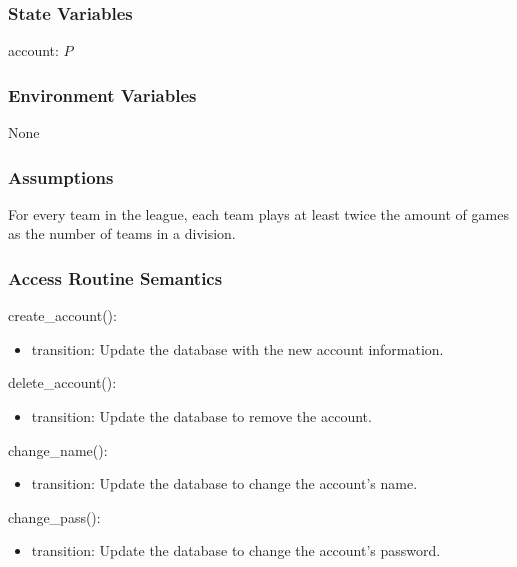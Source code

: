 \documentclass[12pt, titlepage]{article}
\begin{document}
\subsubsection{State Variables}

account: $P$

\subsubsection{Environment Variables}

None

\subsubsection{Assumptions}

For every team in the league, each team plays at least twice the amount of games
as the number of teams in a division.



\subsubsection{Access Routine Semantics}

\noindent create\_account():
\begin{itemize}
\item transition: Update the database with the new account information.
\end{itemize}

\noindent delete\_account():
\begin{itemize}
\item transition: Update the database to remove the account.
\end{itemize}

\noindent change\_name():
\begin{itemize}
\item transition: Update the database to change the account's name.
\end{itemize}

\noindent change\_pass():
\begin{itemize}
\item transition: Update the database to change the account's password.
\end{itemize}
\end{document}
